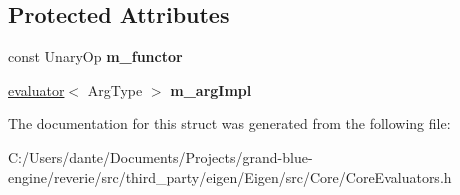 \subsection*{Protected Attributes}
\begin{DoxyCompactItemize}
\item 
\mbox{\label{struct_eigen_1_1internal_1_1unary__evaluator_3_01_cwise_unary_op_3_01_unary_op_00_01_arg_type_01_4_00_01_index_based_01_4_a7bee05b4fed268a396b756fe34aa0ee2}} 
const Unary\+Op {\bfseries m\+\_\+functor}
\item 
\mbox{\label{struct_eigen_1_1internal_1_1unary__evaluator_3_01_cwise_unary_op_3_01_unary_op_00_01_arg_type_01_4_00_01_index_based_01_4_ac6da222f23f9f311bcdd023f2411fe4d}} 
\mbox{\hyperlink{struct_eigen_1_1internal_1_1evaluator}{evaluator}}$<$ Arg\+Type $>$ {\bfseries m\+\_\+arg\+Impl}
\end{DoxyCompactItemize}


The documentation for this struct was generated from the following file\+:\begin{DoxyCompactItemize}
\item 
C\+:/\+Users/dante/\+Documents/\+Projects/grand-\/blue-\/engine/reverie/src/third\+\_\+party/eigen/\+Eigen/src/\+Core/Core\+Evaluators.\+h\end{DoxyCompactItemize}
